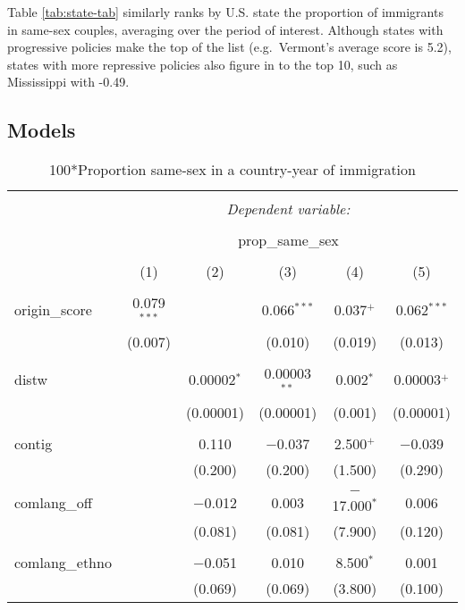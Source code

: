 \documentclass[11pt,]{article}
\begin{document}
Table \ref{tab:state-tab} similarly ranks by U.S. state the proportion of immigrants in same-sex couples, averaging over the period of interest. Although states with progressive policies make the top of the list (e.g.~Vermont's average score is 5.2), states with more repressive policies also figure in to the top 10, such as Mississippi with -0.49.

\hypertarget{models}{%
\subsection{Models}\label{models}}

\begin{table}[!htbp] \centering 
  \caption{100*Proportion same-sex in a country-year of immigration} 
  \label{tab:country-props} 
\begin{tabular}{@{\extracolsep{5pt}}lccccc} 
\\[-1.8ex]\hline 
\hline \\[-1.8ex] 
 & \multicolumn{5}{c}{\textit{Dependent variable:}} \\ 
\cline{2-6} 
\\[-1.8ex] & \multicolumn{5}{c}{prop\_same\_sex} \\ 
\\[-1.8ex] & (1) & (2) & (3) & (4) & (5)\\ 
\hline \\[-1.8ex] 
 origin\_score & 0.079$^{***}$ &  & 0.066$^{***}$ & 0.037$^{+}$ & 0.062$^{***}$ \\ 
  & (0.007) &  & (0.010) & (0.019) & (0.013) \\ 
  & & & & & \\ 
 distw &  & 0.00002$^{*}$ & 0.00003$^{**}$ & 0.002$^{*}$ & 0.00003$^{+}$ \\ 
  &  & (0.00001) & (0.00001) & (0.001) & (0.00001) \\ 
  & & & & & \\ 
 contig &  & 0.110 & $-$0.037 & 2.500$^{+}$ & $-$0.039 \\ 
  &  & (0.200) & (0.200) & (1.500) & (0.290) \\ 
  & & & & & \\ 
 comlang\_off &  & $-$0.012 & 0.003 & $-$17.000$^{*}$ & 0.006 \\ 
  &  & (0.081) & (0.081) & (7.900) & (0.120) \\ 
  & & & & & \\ 
 comlang\_ethno &  & $-$0.051 & 0.010 & 8.500$^{*}$ & 0.001 \\ 
  &  & (0.069) & (0.069) & (3.800) & (0.100) \\ 

\end{tabular}
\end{table}
\end{document}
